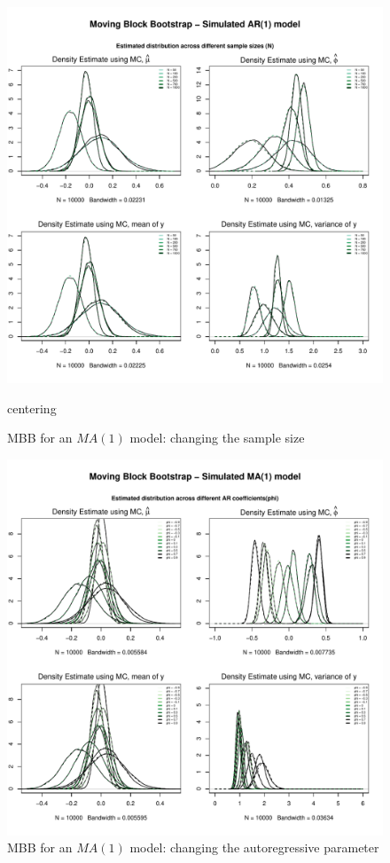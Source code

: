 \documentclass{article}
\begin{document}
\clearpage
\begin{figure}[hbt!]
\includegraphics[width=\textwidth]{plots/MBB_AR1_densities_diff_smpl}
\caption{MBB for an $MA(1)$ model: changing the sample size}
\label{fig:MBB_MA1_densities_diff_smpl}
centering
\end{figure}

\begin{figure}[hbt!]
\includegraphics[width=\textwidth]{plots/MBB_MA1_densities_diff_ARq}
\caption{MBB for an $MA(1)$ model: changing the autoregressive parameter}
\label{fig:MBB_MA1_densities_diff_ARq}
\centering
\end{figure}
\end{document}
